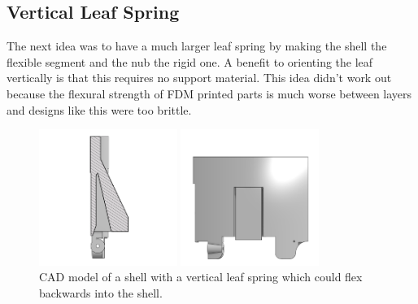 \documentclass{iopart}
\begin{document}
\subsection{Vertical Leaf Spring}

The next idea was to have a much larger leaf spring by making the shell the flexible segment and the nub the rigid one. A benefit to orienting the leaf vertically is that this requires no support material. This idea didn't work out because the flexural strength of FDM printed parts is much worse between layers and designs like this were too brittle.

\begin{figure}[h!]
    \centering
    \includegraphics[width=0.4\textwidth]{graphics/vertical_leaf1.png}
    \includegraphics[width=0.4\textwidth]{graphics/vertical_leaf2.png}\\
    CAD model of a shell with a vertical leaf spring which could flex backwards into the shell.
\end{figure}

\end{document}
